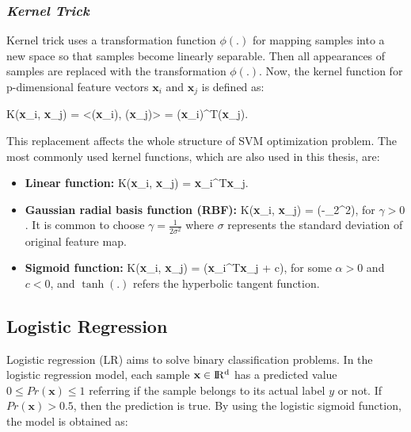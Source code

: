 \subsubsection*{\textit{Kernel Trick}}

Kernel trick uses a transformation function $\phi(.)$ for mapping samples into a new space so that samples become linearly separable. Then all appearances of samples are replaced with the transformation $\phi(.)$. Now, the kernel function for p-dimensional feature vectors $\textbf{x}_{i}$ and $\textbf{x}_{j}$ is defined as:

\be
\label{eq:kernel_function}
K(\textbf{x}_{i}, \textbf{x}_{j}) = <\phi(\textbf{x}_{i}), \phi(\textbf{x}_{j})> = \phi(\textbf{x}_{i})^{T}\phi(\textbf{x}_{j}).
\ee

This replacement affects the whole structure of SVM optimization problem. The most commonly used kernel functions, which are also used in this thesis, are:

\begin{itemize}
	\item \textbf{Linear function:}
	\be
	\label{eq:lienar_kernel_function}
	K(\textbf{x}_{i}, \textbf{x}_{j}) = \textbf{x}_{i}^{T}\textbf{x}_{j}.
	\ee
	
	\item \textbf{Gaussian radial basis function (RBF):}
	\be
	\label{eq:rbf_kernel_function}
	K(\textbf{x}_{i}, \textbf{x}_{j}) = \exp(-\gamma {}_{2}^{2})\:,
	\ee
	for $\gamma >0$. It is common to choose $\gamma =\frac{1}{2\sigma^{2}}$ where $\sigma$ represents the standard deviation of original feature map.
	
	\item \textbf{Sigmoid function:}
	\be
	\label{sigmoid_kernel_function}
	K(\textbf{x}_{i}, \textbf{x}_{j}) = \tanh(\alpha \textbf{x}_{i}^{T}\textbf{x}_{j} + c)\:,
	\ee
	for some $\alpha > 0$ and $c < 0$, and $\tanh(.)$ refers the hyperbolic tangent function.
	
\end{itemize}

\subsection{Logistic Regression}


Logistic regression (LR) aims to solve binary classification problems.
In the logistic regression model, each sample $\textbf{x} \in \rm I\!R^{d}$ has a predicted value $ 0 \leq Pr(\textbf{x}) \leq 1$ referring if the sample belongs to its actual label $y$ or not. If $Pr(\textbf{x})>0.5$, then the prediction is true. By using the logistic sigmoid function, the model is obtained as:

